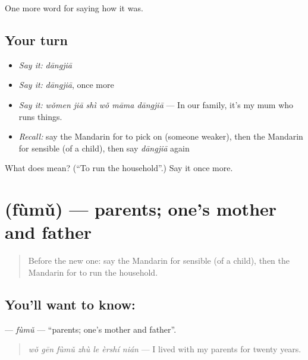\begin{grammarlens}[title={What you've built}]
One more word for saying how it was.
\end{grammarlens}

\subsection*{Your turn}
\begin{itemize}
\raggedright
  \item \emph{Say it:} \emph{dāngjiā}
  \item \emph{Say it:} \emph{dāngjiā}, once more
  \item \emph{Say it:} \emph{wǒmen jiā shì wǒ māma dāngjiā} — In our family, it's my mum who runs things.
  \item \emph{Recall:} say the Mandarin for to pick on (someone weaker), then the Mandarin for sensible (of a child), then say \emph{dāngjiā} again
\end{itemize}

\begin{tcolorbox}[breakable,colback=teal!4,colframe=teal!35!black,title={Before you move on}]
What does  mean? (\textquotedblleft{}To run the household\textquotedblright{}.) Say it once more.
\end{tcolorbox}
\section[\texorpdfstring{\zh{父母} (fùmǔ)}{父母 (fùmǔ)}]{ (fùmǔ) — parents; one's mother and father}

\label{lesson:ZH-C509-fumu}



\begin{quote}
Before the new one: say the Mandarin for sensible (of a child), then the Mandarin for to run the household.
\end{quote}

\subsection*{You'll want to know: }
\textbf{} — \emph{fùmǔ} — \textquotedblleft{}parents; one's mother and father\textquotedblright{}.

\begin{quote}
\emph{wǒ gēn fùmǔ zhù le èrshí nián} — I lived with my parents for twenty years.
\end{quote}

